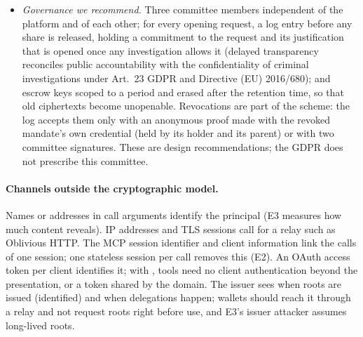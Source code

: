 \begin{itemize}[leftmargin=*]
\item \emph{Governance we recommend.} Three committee members independent of the platform and of each other; for every opening request, a log entry before any share is released, holding a commitment to the request and its justification that is opened once any investigation allows it (delayed transparency reconciles public accountability with the confidentiality of criminal investigations under Art.~23 GDPR and Directive (EU) 2016/680); and escrow keys scoped to a period and erased after the retention time, so that old ciphertexts become unopenable. Revocations are part of the scheme: the log accepts them only with an anonymous proof made with the revoked mandate's own credential (held by its holder and its parent) or with two committee signatures. These are design recommendations; the GDPR does not prescribe this committee.
\end{itemize}

\paragraph{Channels outside the cryptographic model.} Names or addresses in call arguments identify the principal (E3 measures how much content reveals). IP addresses and TLS sessions call for a relay such as Oblivious HTTP. The MCP session identifier and client information link the calls of one session; one stateless session per call removes this (E2). An OAuth access token per client identifies it; with \sys{}, tools need no client authentication beyond the presentation, or a token shared by the domain. The issuer sees when roots are issued (identified) and when delegations happen; wallets should reach it through a relay and not request roots right before use, and E3's issuer attacker assumes long-lived roots.

